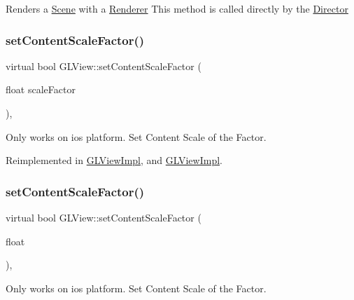 Renders a \hyperlink{classScene}{Scene} with a \hyperlink{classRenderer}{Renderer} This method is called directly by the \hyperlink{classDirector}{Director} \mbox{\label{classGLView_a40714c1d078f964bb51d12228af98054}} 
\subsubsection{\texorpdfstring{set\+Content\+Scale\+Factor()}{setContentScaleFactor()}\hspace{0.1cm}{\footnotesize\ttfamily [1/2]}}
{\footnotesize\ttfamily virtual bool G\+L\+View\+::set\+Content\+Scale\+Factor (\begin{DoxyParamCaption}\item[{float}]{scale\+Factor }\end{DoxyParamCaption})\hspace{0.3cm}{\ttfamily [inline]}, {\ttfamily [virtual]}}

Only works on ios platform. Set Content Scale of the Factor. 

Reimplemented in \hyperlink{classGLViewImpl_ae5fc53c9751b15efc4a6a1bc12db262c}{G\+L\+View\+Impl}, and \hyperlink{classGLViewImpl_a7bd1df076bd10554cc6aff25f2b07238}{G\+L\+View\+Impl}.

\mbox{\label{classGLView_aed19813eb650f6d30f0f385a8f5c4a62}} 
\subsubsection{\texorpdfstring{set\+Content\+Scale\+Factor()}{setContentScaleFactor()}\hspace{0.1cm}{\footnotesize\ttfamily [2/2]}}
{\footnotesize\ttfamily virtual bool G\+L\+View\+::set\+Content\+Scale\+Factor (\begin{DoxyParamCaption}\item[{float}]{ }\end{DoxyParamCaption})\hspace{0.3cm}{\ttfamily [inline]}, {\ttfamily [virtual]}}

Only works on ios platform. Set Content Scale of the Factor. 

